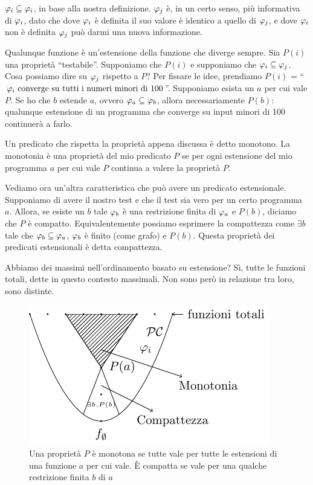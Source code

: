 $\varphi_{i} \subseteq \varphi_{i}$, in base alla nostra definizione. $\varphi_{j}$ è, in un certo senso, più
informativa di $\varphi_{i}$, dato che dove $\varphi_{i}$ è definita il suo valore è identico a quello di
$\varphi_{j}$, e dove $\varphi_{i}$ non è definita $\varphi_{j}$ può darmi una nuova informazione.

Qualunque funzione è un'estensione della funzione che diverge sempre. Sia $P(i)$ una proprietà
``testabile''. Supponiamo che $P(i)$ e supponiamo che $\varphi_{i} \subseteq \varphi_{j}$. Cosa possiamo dire su
$\varphi_{j}$ rispetto a $P$? Per fissare le idee, prendiamo $P(i)$ = ``$\varphi_{i} \text{ converge su tutti i
numeri minori di 100}$''. Supponiamo esista un $a$ per cui vale $P$. Se ho che $b$ estende $a$, ovvero
$\varphi_{a} \subseteq \varphi_{b}$, allora necessariamente $P(b)$: qualunque estensione di un programma che
converge su input minori di 100 continuerà a farlo.

Un predicato che rispetta la proprietà appena discussa è detto monotono. La monotonia è una
proprietà del mio predicato $P$ se per ogni estensione del mio programma $a$ per cui vale $P$
continua a valere la proprietà $P$. 

Vediamo ora un'altra caratteristica che può avere un predicato estensionale. Supponiamo di avere il
nostro test e che il test sia vero per un certo programma $a$. Allora, se esiste un $b$ tale $\varphi_{b}$ è
una restrizione finita di $\varphi_{a}$ e $P(b)$, diciamo che $P$ è compatto. Equivalentemente possiamo
esprimere la compattezza come $\exists b$ tale che $\varphi_{b} \subseteq \varphi_{a}$, $\varphi_{b}$ è finito (come grafo)
e $P(b)$. Questa proprietà dei predicati estensionali è detta compattezza.

Abbiamo dei massimi nell'ordinamento basato su estensione? Sì, tutte le funzioni totali, dette in
questo contesto massimali. Non sono però in relazione tra loro, sono distinte.

\begin{figure}[!h]
    \centering
    \includegraphics{img/ExtensionHierarchy.pdf}
    \caption{Una proprietà $P$ è monotona se tutte vale per tutte le estensioni di una funzione $a$
    per cui vale. È compatta se vale per una qualche restrizione finita $b$ di $a$}
\end{figure}

